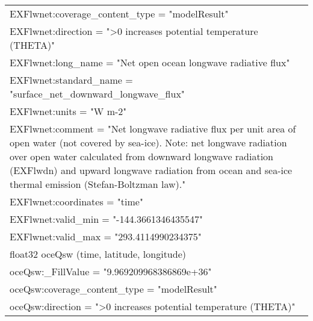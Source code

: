 \begin{longtable}{|p{\textwidth}|}
\hspace{0.5cm}\hspace{0.5cm}EXFlwnet:coverage\_content\_type = "modelResult"\\
\hspace{0.5cm}\hspace{0.5cm}EXFlwnet:direction = ">0 increases potential temperature (THETA)"\\
\hspace{0.5cm}\hspace{0.5cm}EXFlwnet:long\_name = "Net open ocean longwave radiative flux"\\
\hspace{0.5cm}\hspace{0.5cm}EXFlwnet:standard\_name = "surface\_net\_downward\_longwave\_flux"\\
\hspace{0.5cm}\hspace{0.5cm}EXFlwnet:units = "W m-2"\\
\hspace{0.5cm}\hspace{0.5cm}EXFlwnet:comment = "Net longwave radiative flux per unit area of open water (not covered by sea-ice). Note: net longwave radiation over open water calculated from downward longwave radiation (EXFlwdn) and upward longwave radiation from ocean and sea-ice thermal emission (Stefan-Boltzman law)."\\
\hspace{0.5cm}\hspace{0.5cm}EXFlwnet:coordinates = "time"\\
\hspace{0.5cm}\hspace{0.5cm}EXFlwnet:valid\_min = "-144.3661346435547"\\
\hspace{0.5cm}\hspace{0.5cm}EXFlwnet:valid\_max = "293.4114990234375"\\
\hspace{0.5cm}float32 oceQsw (time, latitude, longitude)\\
\hspace{0.5cm}\hspace{0.5cm}oceQsw:\_FillValue = "9.969209968386869e+36"\\
\hspace{0.5cm}\hspace{0.5cm}oceQsw:coverage\_content\_type = "modelResult"\\
\hspace{0.5cm}\hspace{0.5cm}oceQsw:direction = ">0 increases potential temperature (THETA)"\\

\end{longtable}
